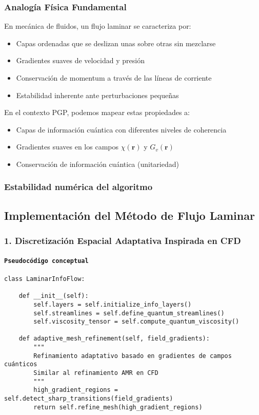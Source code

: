 \documentclass{book}
\begin{document}
\subsubsection*{Analogía Física Fundamental}
En mecánica de fluidos, un flujo laminar se caracteriza por:
\begin{itemize}
    \item Capas ordenadas que se deslizan unas sobre otras sin mezclarse
    \item Gradientes suaves de velocidad y presión
    \item Conservación de momentum a través de las líneas de corriente
    \item Estabilidad inherente ante perturbaciones pequeñas
\end{itemize}
En el contexto PGP, podemos mapear estas propiedades a:
\begin{itemize}
    \item Capas de información cuántica con diferentes niveles de coherencia
    \item Gradientes suaves en los campos $\chi(\mathbf{r})$ y $G_v(\mathbf{r})$
    \item Conservación de información cuántica (unitariedad)
\end{itemize}

\subsubsection*{Estabilidad numérica del algoritmo}
\subsection*{Implementación del Método de Flujo Laminar}

\subsubsection*{1. Discretización Espacial Adaptativa Inspirada en CFD}
\paragraph*{\texttt{Pseudocódigo conceptual}}
\begin{verbatim}
class LaminarInfoFlow:

    def __init__(self):
        self.layers = self.initialize_info_layers()
        self.streamlines = self.define_quantum_streamlines()
        self.viscosity_tensor = self.compute_quantum_viscosity()

    def adaptive_mesh_refinement(self, field_gradients):
        """
        Refinamiento adaptativo basado en gradientes de campos cuánticos
        Similar al refinamiento AMR en CFD
        """
        high_gradient_regions = self.detect_sharp_transitions(field_gradients)
        return self.refine_mesh(high_gradient_regions)
\end{verbatim}
\end{document}

